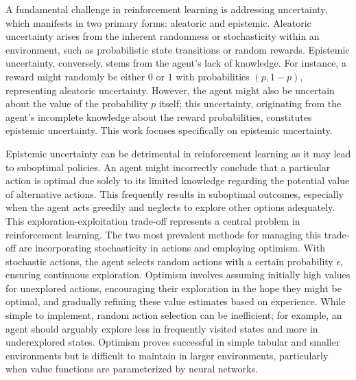 \documentclass[11pt,a4paper]{report}
\begin{document}
\par
A fundamental challenge in reinforcement learning is addressing uncertainty, which manifests in two primary forms: aleatoric and epistemic. Aleatoric uncertainty arises from the inherent randomness or stochasticity within an environment, such as probabilistic state transitions or random rewards. Epistemic uncertainty, conversely, stems from the agent's lack of knowledge. For instance, a reward might randomly be either $0$ or $1$ with probabilities $(p, 1-p)$, representing aleatoric uncertainty. However, the agent might also be uncertain about the value of the probability $p$ itself; this uncertainty, originating from the agent's incomplete knowledge about the reward probabilities, constitutes epistemic uncertainty. This work focuses specifically on epistemic uncertainty.

\par
Epistemic uncertainty can be detrimental in reinforcement learning as it may lead to suboptimal policies. An agent might incorrectly conclude that a particular action is optimal due solely to its limited knowledge regarding the potential value of alternative actions. This frequently results in suboptimal outcomes, especially when the agent acts greedily and neglects to explore other options adequately. This exploration-exploitation trade-off represents a central problem in reinforcement learning. The two most prevalent methods for managing this trade-off are incorporating stochasticity in actions and employing optimism. With stochastic actions, the agent selects random actions with a certain probability $\epsilon$, ensuring continuous exploration. Optimism involves assuming initially high values for unexplored actions, encouraging their exploration in the hope they might be optimal, and gradually refining these value estimates based on experience. While simple to implement, random action selection can be inefficient; for example, an agent should arguably explore less in frequently visited states and more in underexplored states. Optimism proves successful in simple tabular and smaller environments but is difficult to maintain in larger environments, particularly when value functions are parameterized by neural networks.
\end{document}
